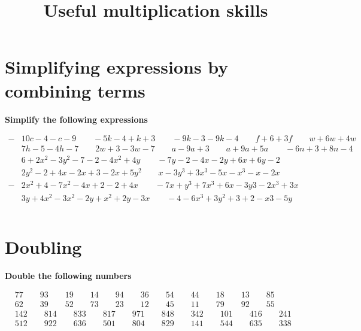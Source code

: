 \documentclass{article}
\begin{document}
\newpage

\section{Simplifying expressions by combining terms}

\textbf{Simplify the following expressions}

\bigskip

\(\begin{aligned}
	-&10c-4-c-9 \qquad -5k-4+k+3 \qquad -9k-3-9k-4 \qquad f+6+3f \qquad w+6w+4w \\[2em]
	&7h-5-4h-7 \qquad 2w+3-3w-7 \qquad a-9a+3 \qquad a+9a+5a \qquad -6n+3+8n-4 \\[2em]
	&6+2x^2-3y^2-7-2-4x^2+4y \qquad -7y-2-4x-2y+6x+6y-2\\[2em]
	&2y^2-2+4x-2x+3-2x+5y^2 \qquad x-3y^3+3x^3-5x-x^3-x-2x\\[2em]
	-&2x^2+4-7x^2-4x+2-2+4x \qquad -7x+y^3+7x^3+6x-3y3-2x^3+3x \\[2em]
	&3y+4x^2-3x^2-2y+x^2+2y-3x \qquad -4-6x^3+3y^2+3+2-x3-5y \\\\
\end{aligned}\)

\begin{center}
	\title{\large{Useful multiplication skills}}
\end{center}

\section{Doubling}
\textbf{Double the following numbers}

\bigskip

\(\begin{aligned}
	&77 \qquad 93 \qquad 19 \qquad 14 \qquad 94 \qquad 36 \qquad 54 \qquad 44 \qquad 18 \qquad 13 \qquad 85 \\[2em]
	&62 \qquad 39 \qquad 52 \qquad 73 \qquad 23 \qquad 12 \qquad 45 \qquad 11 \qquad 79 \qquad 92 \qquad 55 \\[2em]
	&142 \qquad 814 \qquad 833 \qquad 817 \qquad 971 \qquad 848 \qquad 342 \qquad 101 \qquad 416 \qquad 241 \\[2em]
	&512 \qquad 922 \qquad 636 \qquad 501 \qquad 804 \qquad 829 \qquad 141 \qquad 544 \qquad 635 \qquad 338 \\\\
\end{aligned}\)
\end{document}

